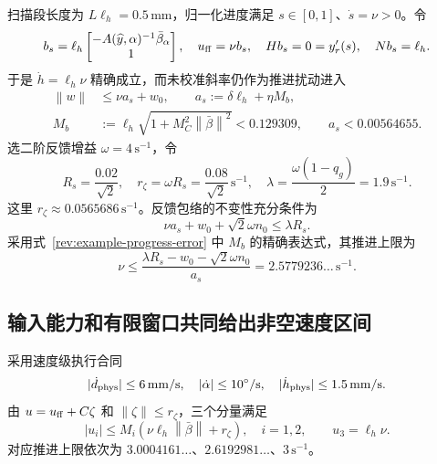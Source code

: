 \documentclass[11pt,a4paper]{article}
\numberwithin{equation}{section}
\theoremstyle{definition}
\newcommand{\norm}[1]{\left\lVert#1\right\rVert}
\begin{document}
扫描段长度为 $L\ell_h=0.5\,\mathrm{mm}$，归一化进度满足
$s\in[0,1]$、$\dot s=\nu>0$。令
\begin{equation}
 b_s=\ell_h\begin{bmatrix}-A(\widehat y,\alpha)^{-1}\bar\beta_\alpha\\1\end{bmatrix},
 \quad u_{\rm ff}=\nu b_s,
 \quad Hb_s=0=y_r'(s),
 \quad Nb_s=\ell_h.
 \label{rev:example-feedforward}
\end{equation}
于是 $\dot h=\ell_h\nu$ 精确成立，而未校准斜率仍作为推进扰动进入
\begin{equation}
 \begin{aligned}
 \norm{w}&\le\nu a_s+w_0,
 \qquad a_s:=\delta\ell_h+\eta M_b,\\
 M_b&:=\ell_h\sqrt{1+M_C^2\norm{\bar\beta}^2}
 <0.129309,\qquad a_s<0.00564655.
 \end{aligned}
 \label{rev:example-progress-error}
\end{equation}
选二阶反馈增益 $\omega=4\,\mathrm{s}^{-1}$，令
\begin{equation}
 R_s=\frac{0.02}{\sqrt2},
 \quad r_\zeta=\omega R_s=\frac{0.08}{\sqrt2}\,\mathrm{s}^{-1},
 \quad\lambda=\frac{\omega(1-q_g)}2=1.9\,\mathrm{s}^{-1}.
 \label{rev:example-feedback-constants}
\end{equation}
这里 $r_\zeta\approx0.0565686\,\mathrm{s}^{-1}$。反馈包络的不变性充分条件为
\begin{equation}
 \nu a_s+w_0+\sqrt2\omega n_0\le\lambda R_s.
 \label{rev:example-recovery-inequality}
\end{equation}
采用式~\eqref{rev:example-progress-error} 中 $M_b$ 的精确表达式，其推进上限为
\begin{equation}
 \nu\le
 \frac{\lambda R_s-w_0-\sqrt2\omega n_0}{a_s}
 =2.5779236\ldots\,\mathrm{s}^{-1}.
 \label{rev:example-recovery-speed}
\end{equation}

\subsection{输入能力和有限窗口共同给出非空速度区间}
采用速度级执行合同
\begin{equation}
 |\dot d_{\rm phys}|\le6\,\mathrm{mm/s},
 \quad|\dot\alpha|\le10^\circ/\mathrm{s},
 \quad|\dot h_{\rm phys}|\le1.5\,\mathrm{mm/s}.
 \label{rev:example-physical-input-set}
\end{equation}
由 $u=u_{\rm ff}+C\zeta$ 和 $\norm{\zeta}\le r_\zeta$，三个分量满足
\begin{equation}
 |u_i|\le M_i(\nu\ell_h\norm{\bar\beta}+r_\zeta),\quad i=1,2,
 \qquad u_3=\ell_h\nu.
 \label{rev:example-component-inputs}
\end{equation}
对应推进上限依次为
$3.0004161\ldots$、$2.6192981\ldots$、$3\,\mathrm{s}^{-1}$。
\end{document}
